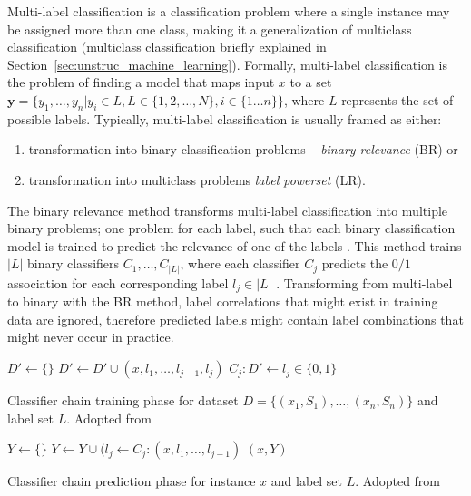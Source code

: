 Multi-label classification is a classification problem where 
a single instance may be assigned more than one class, making it 
a generalization of multiclass classification (multiclass classification briefly 
explained in Section~\ref{sec:unstruc_machine_learning}).
Formally, multi-label classification is the problem of finding 
a model that maps input $x$ to a set $\mathbf{y} = \{y_1, \dots, y_n | y_i \in
L, L \in \{1, 2, \dots, N\}, i \in \{1 \dots n\} \}$, where $L$ represents the
set of possible labels.
Typically, multi-label classification is usually framed as either:
\begin{enumerate}
	\item transformation into binary classification problems -- \textit{binary relevance} (BR) \citep{luaces2012binary} or
	\item transformation into multiclass problems \textit{label powerset} (LR).
\end{enumerate}
The binary relevance method transforms multi-label classification
into multiple binary problems; one problem for each label, such that each
binary classification model is trained to predict the relevance of one of the labels
\citep{read2011classifier}. This method trains $|L|$ binary classifiers
$C_1, \dots, C_{|L|}$, where each classifier $C_j$ predicts the $0/1$ association
for each corresponding label $l_j \in |L|$ \citep{read2011classifier}.
Transforming from multi-label to binary with the BR method, label correlations
that might exist in training data are ignored, therefore predicted labels might
contain label combinations that might never occur in practice. 

\begin{algorithm}[t]
\begin{algorithmic}[1]
  \State $D' \gets \{\}$
	  \State $D' \gets D' \cup (x, l_1, \dots, l_{j - 1}, l_j)$
	  \State $C_j: D' \gets l_j \in \{0, 1\}$
	\EndFor
\EndFor
\end{algorithmic}
\caption{Classifier chain training phase for dataset 
	$D = \{(x_1, S_1), \dots, (x_n, S_n)\}$
	and label set $L$.
	Adopted from~\citep{read2011classifier}
	}

\label{alg:train_chain_classifier}
\end{algorithm}

\begin{algorithm}[t]
\begin{algorithmic}[1]
\State $Y \gets \{\}$
  \State $Y \gets Y \cup (l_j \gets C_j: (x, l_1, \dots, l_{j - 1})$
\EndFor
\Return $(x, Y)$
\end{algorithmic}
\caption{Classifier chain prediction phase for instance $x$ 
	and label set $L$.
	Adopted from~\citep{read2011classifier}
	}
\label{alg:test_chain_classifier}
\end{algorithm}

